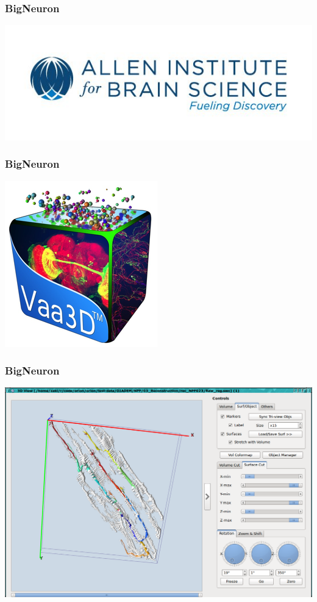 \begin{frame}\frametitle{BigNeuron}
	\centering
	\includegraphics[height=0.3\textheight]{gfx/present/alleninsitute12}
\end{frame}
\begin{frame}\frametitle{BigNeuron}
	\centering
	\includegraphics[height=0.5\textheight]{gfx/present/vaa3d-logo}
\end{frame}
\begin{frame}\frametitle{BigNeuron}
	\centering
	\includegraphics[height=0.5\textheight]{gfx/present/vaa3d-load-swc}
\end{frame}

